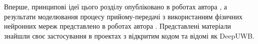 





Вперше, принципові ідеї цього розділу опубліковано в роботах
автора \cite{my:Telecom2018, my:UKRCON2019}, а результати моделювання 
процесу прийому-передачі з використанням фізичних нейронних мереж 
представлено в роботах автора \cite{my:TKEA2020, my:UKRCON2020}. 
Представлені матеріали знайшли своє застосування в проектах з відкритим 
кодом та відомі як DeepUWB.
